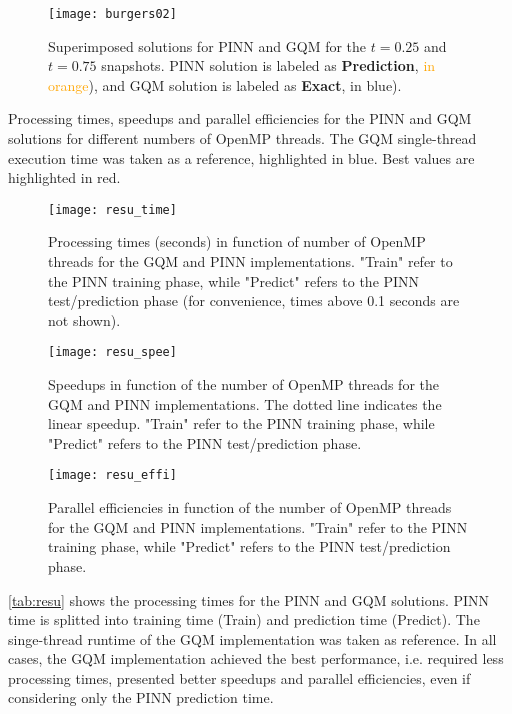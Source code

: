 \documentclass[conference]{IEEEtran}
\begin{document}
\begin{figure}[htb]
\centering
\texttt{[image: burgers02]}
\caption{Superimposed solutions for PINN and GQM for the $t=0.25$ and $t=0.75$ snapshots. PINN solution is labeled as \textbf{Prediction}, \textcolor{orange}{in orange}), and GQM solution is labeled as \textbf{Exact}, \textcolor{NavyBlue}{in blue}).}
\label{fig:bur2}
\end{figure}

\begin{table}[htb]
\centering
\caption{Processing times, speedups and parallel efficiencies for the PINN and GQM solutions for different numbers of OpenMP threads. The GQM single-thread execution time was taken as a reference, highlighted in blue. Best values are highlighted in red.}
\label{tab:resu}

\end{table}

\begin{figure}[htb]
\centering
\texttt{[image: resu\_time]}
\caption{Processing times (seconds) in function of number of OpenMP threads for the GQM and PINN implementations. "Train" refer to the PINN training phase, while "Predict" refers to the PINN test/prediction phase (for convenience, times above 0.1 seconds are not shown).}
\label{fig:time}
\end{figure}

\begin{figure}[htb]
\centering
\texttt{[image: resu\_spee]}
\caption{Speedups in function of the number of OpenMP threads for the GQM and PINN implementations. The dotted line indicates the linear speedup. "Train" refer to the PINN training phase, while "Predict" refers to the PINN test/prediction phase.}
\label{fig:spee}
\end{figure}

\begin{figure}[htb]
\centering
\texttt{[image: resu\_effi]}
\caption{Parallel efficiencies in function of the number of OpenMP threads for the GQM and PINN implementations. "Train" refer to the PINN training phase, while "Predict" refers to the PINN test/prediction phase.}
\label{fig:effi}
\end{figure}

\autoref{tab:resu} shows the processing times for the PINN and GQM solutions. PINN time is splitted into training time (Train) and prediction time (Predict). The singe-thread runtime of the GQM implementation was taken as reference. In all cases, the GQM implementation achieved the best performance, i.e. required less processing times, presented better speedups and parallel efficiencies, even if considering only the PINN prediction time. 
\end{document}
